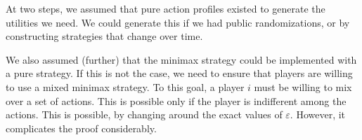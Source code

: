 \documentclass[10pt]{article}
\begin{document}
\begin{remark}
	At two steps, we assumed that pure action profiles existed to generate the utilities we need. We could generate this if we had public randomizations, or by constructing strategies that change over time.
\end{remark}
\begin{remark}
	We also assumed (further) that the minimax strategy could be implemented with a pure strategy. If this is not the case, we need to ensure that players are willing to use a mixed minimax strategy. To this goal, a player $i$ must be willing to mix over a set of actions. This is possible only if the player is indifferent among the actions. This is possible, by changing around the exact values of $\varepsilon$. However, it complicates the proof considerably.
\end{remark}
\end{document}
